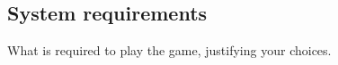 \subsection{System requirements}
What is required to play the game, justifying your choices.

\pagebreak